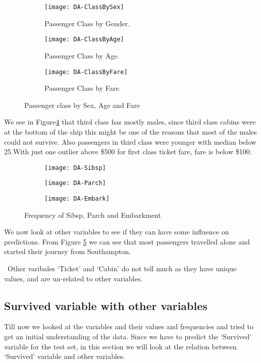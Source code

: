 \documentclass[a4paper,10pt]{report}
\begin{document}
\begin{figure}[h]
\centering
  \begin{subfigure}[b]{0.3\textwidth}
    \texttt{[image: DA-ClassBySex]}
    \caption{Passenger Class by Gender.} \label{ClassBySex}
  \end{subfigure}
  \begin{subfigure}[b]{0.3\textwidth}
    \texttt{[image: DA-ClassByAge]}
    \caption{Passenger Class by Age.} \label{ClassByAge}
  \end{subfigure}
  \begin{subfigure}[b]{0.3\textwidth}
    \texttt{[image: DA-ClassByFare]}
    \caption{Passenger Class by Fare.} \label{ClassByFare}
  \end{subfigure}
  \caption{Passenger class by Sex, Age and Fare}\label{Class}
\end{figure}
We see in Figure\ref{Class} that third class has mostly males, since third class cabins were at the bottom of the ship this might be one of the reasons that most of the males could not survive. Also passengers in third class were younger with median below 25.With just one outlier above \$500 for first class ticket fare, fare is below \$100.


\begin{figure}[h]
\centering
  \begin{subfigure}[b]{0.3\textwidth}
    \texttt{[image: DA-Sibsp]}
    \end{subfigure}
  \begin{subfigure}[b]{0.3\textwidth}
    \texttt{[image: DA-Parch]}
    \end{subfigure}
  \begin{subfigure}[b]{0.3\textwidth}
    \texttt{[image: DA-Embark]}
  \end{subfigure}
  \caption{Frequency of Sibsp, Parch and Embarkment}\label{Var}
\end{figure}
We now look at other variables to see if they can have some influence on predictions. From Figure \ref{Var} we can see that  most passengers travelled alone and started their journey from Southampton.

\ Other varibales `Ticket' and `Cabin' do not tell much as they have unique values, and are un-related to other variables.
\subsection{Survived variable with other variables}
Till now we looked at the variables and their values and frequencies and tried to get an initial understanding of the data.
Since we have to predict the `Survived' variable for the test set, in this section we will look at the relation between `Survived' variable and other variables.
\end{document}
